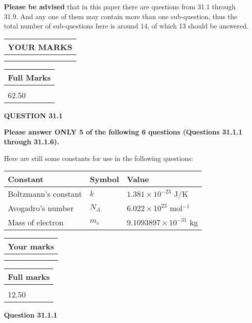 \documentclass[12pt]{article}
\begin{document}
 
{\textbf{\large{Please be advised}}} that in this paper there are questions from
31.1 through
31.9.
And any one of them may contain more than one sub-question, thus the total number
of sub-questions here is around 14, of which
13 should be answered.
 
\vspace{0.3in}
 
 
   
   
  
\vspace{0.2in}
  
\noindent\begin{tabular}{|l|}
\hline
 YOUR MARKS  \\
\hline
 \\ 
 \\ 
\hline
\end{tabular}
\hspace{0.05in} \begin{tabular}{|l|}
\hline
 Full Marks  \\
\hline
 \\ 
62.50 \\
\hline
\end{tabular}
{\textbf{\Large{QUESTION
31.1 
}}}
  
  
 
{\textbf{\Large{Please answer ONLY
5 of the following
6 questions (Questions
31.1.1 through
31.1.6). }}}
 
Here are still some constants for use in the following questions:
 
 
\noindent\begin{tabular}{|l|l|l|}
\hline
Constant & Symbol & Value \\
\hline
 
Boltzmann's constant &
$k$ &
 $ 1.381 \times 10^{-23} $
J/K \\
\hline
 
Avogadro's number &
$N_A$ &
 $ 6.022 \times 10^{23} $
mol$^{-1}$ \\
\hline
 
Mass of electron &
$m_e$ &
 $ 9.1093897 \times 10^{-31} $
kg \\
\hline
 
\end{tabular}
 
  
\vspace{0.2in}
  
         \begin{tabular}{|l|}
\hline
 Your marks  \\
\hline
 \\ 
 \\ 
\hline
\end{tabular}
\hspace{0.05in} \begin{tabular}{|l|}
\hline
 Full marks  \\
\hline
 \\ 
12.50 \\
\hline
\end{tabular}
{\textbf{\Large{Question
31.1.1 
}}}
  
\end{document}

